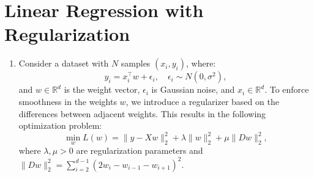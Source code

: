 \documentclass[a3paper,12pt]{extarticle} %
\begin{document}
\section{Linear Regression with Regularization}
\begin{enumerate}
    \item Consider a dataset with \( N \) samples \((x_i, y_i)\), where:
    \[
    y_i = x_i^\top w + \epsilon_i, \quad \epsilon_i \sim N(0, \sigma^2),
    \]
    and \( w \in \mathbb{R}^d \) is the weight vector, \(\epsilon_i\) is Gaussian noise, and \( x_i \in \mathbb{R}^d \).
    To enforce smoothness in the weights \( w \), we introduce a regularizer based on the differences between adjacent weights. This results in the following optimization problem:
    \[
    \min_w L(w) = \|y - Xw\|_2^2 + \lambda \|w\|_2^2 + \mu \|Dw\|_2^2,
    \]
    where \(\lambda, \mu > 0\) are regularization parameters and \(\|Dw\|_2^2 = \sum_{i=2}^{d-1} (2w_i - w_{i-1} - w_{i+1})^2\).


\end{enumerate}
\end{document}
